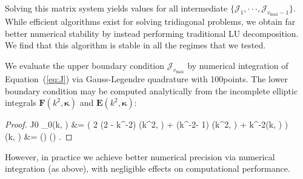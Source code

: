 \documentclass[modern]{aastex62}
\newcommand{\STARRYQUADPOINTS}{100}
\newcommand{\kap}{\boldsymbol{\kappa}}
\newcommand{\kmt}{k^{-2}}
\newcommand{\vmax}{{v_\mathrm{max}}}
\begin{document}
%
Solving this matrix system yields values for all
intermediate $\{ \mathcal{J}_1, {\cdot\cdot\cdot}, \mathcal{J}_{\vmax - 1} \}$.
While efficient algorithms exist for solving tridiagonal problems, we obtain
far better numerical stability by instead performing traditional LU
decomposition. We find that this algorithm is stable in all the regimes that we
tested.

We evaluate the upper boundary condition $\mathcal{J}_{\vmax}$ by numerical
integration of Equation~(\ref{eq:J}) via Gauss-Legendre quadrature with
\STARRYQUADPOINTS points. The lower boundary condition may be computed
analytically from the incomplete elliptic integrals $\mathbf{F}(k^2, \kap)$
and $\mathbf{E}(k^2, \kap)$:
%
\begin{proof}{J0}
    \label{eq:J0}
    _0(k, \kap) &=
     \bigg(
    2 (2 - \kmt) \Delta {}(k^2, \kap) +
    (\kmt - 1) \Delta {}(k^2, \kap) +
    \kmt \Delta {}(k, \kap)
    \bigg)
    \nonumber \\
    (k, \boldsymbol{\kappa}) &=
    \sin\left(\frac{\kap}{2}\right)
    \cos\left(\frac{\kap}{2}\right)
    \sqrt{1 - \kmt \sin^2\left(\frac{\kap}{2}\right)}
    \quad.
\end{proof}
%
However, in practice we achieve better numerical precision via numerical
integration (as above), with negligible effects on computational performance.


\end{document}
